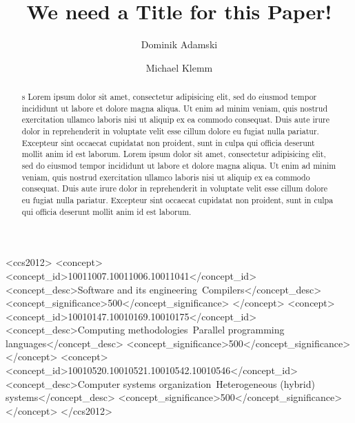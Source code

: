 \documentclass[acmtog,natbib=false]{acmart}
\begin{document}
\title{We need a Title for this Paper!}

\author{Dominik Adamski}
\orcid{}

\author{Michael Klemm}

\renewcommand{\shortauthors}{Adamski et al.}

\begin{abstract}s
Lorem ipsum dolor sit amet, consectetur adipisicing elit, sed do eiusmod
tempor incididunt ut labore et dolore magna aliqua. Ut enim ad minim veniam,
quis nostrud exercitation ullamco laboris nisi ut aliquip ex ea commodo
consequat. Duis aute irure dolor in reprehenderit in voluptate velit esse
cillum dolore eu fugiat nulla pariatur. Excepteur sint occaecat cupidatat non
proident, sunt in culpa qui officia deserunt mollit anim id est laborum.
Lorem ipsum dolor sit amet, consectetur adipisicing elit, sed do eiusmod
tempor incididunt ut labore et dolore magna aliqua. Ut enim ad minim veniam,
quis nostrud exercitation ullamco laboris nisi ut aliquip ex ea commodo
consequat. Duis aute irure dolor in reprehenderit in voluptate velit esse
cillum dolore eu fugiat nulla pariatur. Excepteur sint occaecat cupidatat non
proident, sunt in culpa qui officia deserunt mollit anim id est laborum.
\end{abstract}

\begin{CCSXML}
<ccs2012>
   <concept>
       <concept_id>10011007.10011006.10011041</concept_id>
       <concept_desc>Software and its engineering~Compilers</concept_desc>
       <concept_significance>500</concept_significance>
       </concept>
   <concept>
       <concept_id>10010147.10010169.10010175</concept_id>
       <concept_desc>Computing methodologies~Parallel programming languages</concept_desc>
       <concept_significance>500</concept_significance>
       </concept>
   <concept>
       <concept_id>10010520.10010521.10010542.10010546</concept_id>
       <concept_desc>Computer systems organization~Heterogeneous (hybrid) systems</concept_desc>
       <concept_significance>500</concept_significance>
       </concept>
 </ccs2012>
\end{CCSXML}
\end{document}
